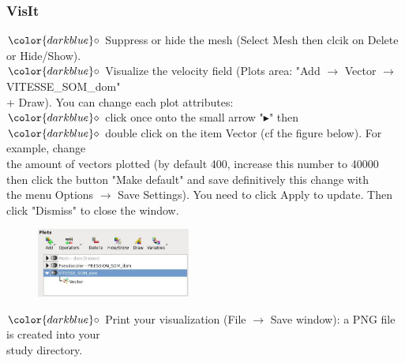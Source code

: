 \documentclass[10pt]{beamer}
\begin{document}
\begin{frame}
\frametitle{VisIt}
\begin{block}{}

\hspace{1cm} $\color{darkblue}\circ$ {\small{Suppress or hide the mesh (Select Mesh then clcik on Delete or Hide/Show).}}\\
\hspace{1cm} $\color{darkblue}\circ$ {\small{Visualize the velocity field ({\footnotesize{Plots area: "Add $\rightarrow$ Vector $\rightarrow$ VITESSE\_SOM\_dom"}}\\
\hspace{1.3cm} {\footnotesize{ + Draw)}}. You can change each plot attributes:}}\\
\vspace{0.05cm}
\hspace{1.5cm} $\color{darkblue}\diamond$ {\footnotesize{click once onto the small arrow "$\blacktriangleright$" then }}\\
\hspace{1.5cm} $\color{darkblue}\diamond$ {\footnotesize{double click on the item Vector (cf the figure below). For example, change \\
\hspace{1.8cm} the amount of vectors plotted (by default 400, increase this number to 40000 \\
\hspace{1.8cm} then click the button "Make default" and save definitively this change with \\
\hspace{1.8cm} the menu Options $\rightarrow$ Save Settings). You need to click Apply to update. Then \\
\hspace{1.8cm} click "Dismiss" to close the window.}}\\

\begin{figure}
\includegraphics[width=0.45\textwidth]{PICTURES/visit3.jpg}
\end{figure}

\hspace{1cm} $\color{darkblue}\circ$ {\small{Print your visualization (File $\rightarrow$ Save window): a PNG file is created into your \\
\hspace{1.3cm} study directory.}}

\end{block}
\end{frame}
\end{document}
